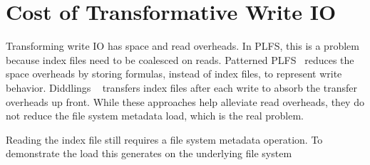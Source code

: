 \section{Cost of Transformative Write IO}

Transforming write IO has space and read overheads. In PLFS, this is a problem
because index files need to be coalesced on reads.  Patterned
PLFS~\cite{he:hpdc13-plfs-patterns} reduces the space overheads by storing
formulas, instead of index files, to represent write behavior. Diddlings
~\cite{grider:pc17-diddlings} transfers index files after each write to absorb
the transfer overheads up front. While these approaches help alleviate read
overheads, they do not reduce the file system metadata load, which is the real
problem.

Reading the index file still requires a file system metadata operation. To
demonstrate the load this generates on the underlying file system
